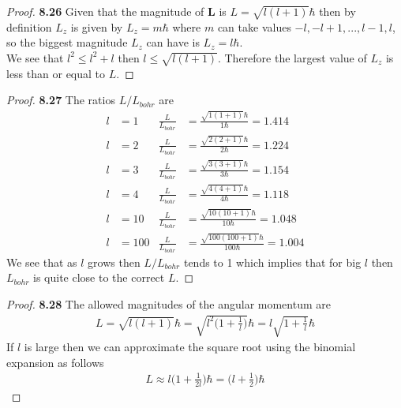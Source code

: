 \documentclass[11pt]{article}
\theoremstyle{definition}
\begin{document}
\cleardoublepage
\begin{proof}{\textbf{8.26}}
Given that the magnitude of $\bm{L}$ is $L = \sqrt{l(l +1 )} \hbar$ then by
definition $L_z$ is given by $L_z = m\hbar$ where $m$ can take values
$-l, -l+1, ..., l-1, l$, so the biggest magnitude $L_z$ can have is
$L_z = l\hbar$.
\\
We see that $l^2 \leq l^2 + l$ then $l \leq \sqrt{l(l+1)}$. Therefore the
largest value of $L_z$ is less than or equal to $L$.
\end{proof}
\begin{proof}{\textbf{8.27}}
The ratios $L/L_{bohr}$ are
\begin{align*}
l &= 1 & \frac{L}{L_{bohr}} &= \frac{\sqrt{1(1 + 1)}\hbar}{1 \hbar} = 1.414\\
l &= 2 & \frac{L}{L_{bohr}} &= \frac{\sqrt{2(2 + 1)}\hbar}{2 \hbar} = 1.224\\
l &= 3 & \frac{L}{L_{bohr}} &= \frac{\sqrt{3(3 + 1)}\hbar}{3 \hbar} = 1.154\\
l &= 4 & \frac{L}{L_{bohr}} &= \frac{\sqrt{4(4 + 1)}\hbar}{4 \hbar} = 1.118\\
l &= 10 & \frac{L}{L_{bohr}} &= \frac{\sqrt{10(10 + 1)}\hbar}{10 \hbar} = 1.048\\
l &= 100 & \frac{L}{L_{bohr}} &= \frac{\sqrt{100(100 + 1)}\hbar}{100 \hbar} = 1.004
\end{align*}
We see that as $l$ grows then $L/L_{bohr}$ tends to 1 which implies that for
big $l$ then $L_{bohr}$ is quite close to the correct $L$.

\end{proof}
\begin{proof}{\textbf{8.28}}
The allowed magnitudes of the angular momentum are 
\begin{align*}
    L = \sqrt{l(l + 1)}\hbar = \sqrt{l^2\bigg(1 + \frac{1}{l}\bigg)}\hbar
    = l\sqrt{1 + \frac{1}{l}}\hbar
\end{align*}
If $l$ is large then we can approximate the square root using the binomial
expansion as follows
\begin{align*}
    L \approx l\bigg(1 + \frac{1}{2l}\bigg)\hbar
    = \bigg(l + \frac{1}{2}\bigg)\hbar
\end{align*}
\end{proof}
\end{document}

